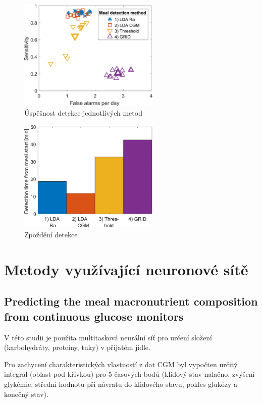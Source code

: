 \begin{figure}[H]
\caption{Úspěšnost detekce jednotlivých metod}
\label{fig:lda1}
\centering
\includegraphics[width=0.6\textwidth]{img/analyza/lda1.png}
\end{figure}
\begin{figure}[H]
\caption{Zpoždění detekce}
\label{fig:lda2}
\centering
\includegraphics[width=0.6\textwidth]{img/analyza/lda2.png}
\end{figure}


\section{Metody využívající neuronové sítě}
\subsection{Predicting the meal macronutrient composition from continuous glucose monitors \citep{Analyza.Neuronka}}
\label{ch:neuronka}

V této studii je použita multitasková neurální síť pro určení složení (karbohydráty, proteiny, tuky) v přijatém jídle.

Pro zachycení charakteristických vlastností z dat CGM byl vypočten určitý integrál (oblast pod křivkou) pro 5 časových bodů (klidový stav nalačno, zvýšení glykémie, střední hodnotu při návratu do klidového stavu, pokles glukózy a konečný stav).

